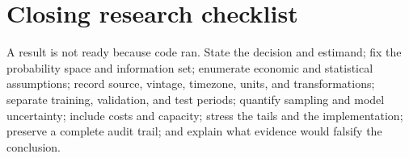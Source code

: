 \documentclass[12pt,oneside,openany]{book}
\begin{document}
\backmatter
\chapter*{Closing research checklist}
A result is not ready because code ran. State the decision and estimand; fix the
probability space and information set; enumerate economic and statistical
assumptions; record source, vintage, timezone, units, and transformations; separate
training, validation, and test periods; quantify sampling and model uncertainty;
include costs and capacity; stress the tails and the implementation; preserve a
complete audit trail; and explain what evidence would falsify the conclusion.


\end{document}
